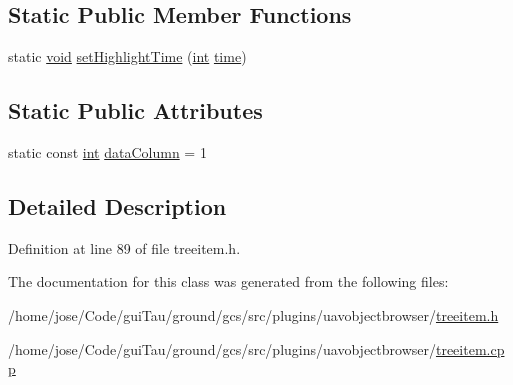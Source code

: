 \subsection*{Static Public Member Functions}
\begin{DoxyCompactItemize}
\item 
static \hyperlink{group___u_a_v_objects_plugin_ga444cf2ff3f0ecbe028adce838d373f5c}{void} \hyperlink{group___u_a_v_object_browser_plugin_ga75de400d0bd7ba687fcc1535a3a0f871}{set\-Highlight\-Time} (\hyperlink{ioapi_8h_a787fa3cf048117ba7123753c1e74fcd6}{int} \hyperlink{analyze_raw_8m_a70c092a6aebace0b1ea406e14da78a40}{time})
\end{DoxyCompactItemize}
\subsection*{Static Public Attributes}
\begin{DoxyCompactItemize}
\item 
static const \hyperlink{ioapi_8h_a787fa3cf048117ba7123753c1e74fcd6}{int} \hyperlink{group___u_a_v_object_browser_plugin_gad4ee9a1203f812d975a410765ddb8710}{data\-Column} = 1
\end{DoxyCompactItemize}


\subsection{Detailed Description}


Definition at line 89 of file treeitem.\-h.



The documentation for this class was generated from the following files\-:\begin{DoxyCompactItemize}
\item 
/home/jose/\-Code/gui\-Tau/ground/gcs/src/plugins/uavobjectbrowser/\hyperlink{treeitem_8h}{treeitem.\-h}\item 
/home/jose/\-Code/gui\-Tau/ground/gcs/src/plugins/uavobjectbrowser/\hyperlink{treeitem_8cpp}{treeitem.\-cpp}\end{DoxyCompactItemize}

